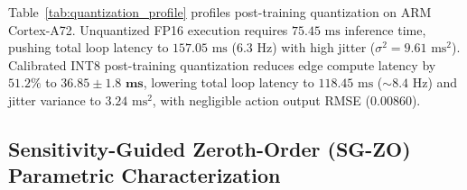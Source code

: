 \documentclass[conference]{IEEEtran}
\begin{document}
\begin{table}[!t]
\centering
\caption{Cross-Platform Quantization \& Real-Time Loop Latency Profiling}
\label{tab:quantization_profile}
\end{table}

Table~\ref{tab:quantization_profile} profiles post-training quantization on ARM Cortex-A72. Unquantized FP16 execution requires $75.45\text{ ms}$ inference time, pushing total loop latency to $157.05\text{ ms}$ ($6.3\text{ Hz}$) with high jitter ($\sigma^2 = 9.61\text{ ms}^2$). Calibrated INT8 post-training quantization reduces edge compute latency by $51.2\%$ to $\mathbf{36.85 \pm 1.8\text{ ms}}$, lowering total loop latency to $118.45\text{ ms}$ ($\sim 8.4\text{ Hz}$) and jitter variance to $3.24\text{ ms}^2$, with negligible action output RMSE ($0.00860$).

\subsection{Sensitivity-Guided Zeroth-Order (SG-ZO) Parametric Characterization}
\end{document}
